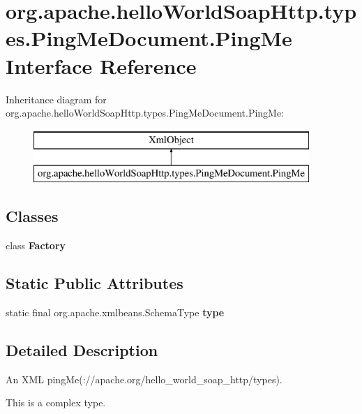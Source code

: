 \hypertarget{interfaceorg_1_1apache_1_1hello_world_soap_http_1_1types_1_1_ping_me_document_1_1_ping_me}{}\section{org.\+apache.\+hello\+World\+Soap\+Http.\+types.\+Ping\+Me\+Document.\+Ping\+Me Interface Reference}
\label{interfaceorg_1_1apache_1_1hello_world_soap_http_1_1types_1_1_ping_me_document_1_1_ping_me}
Inheritance diagram for org.\+apache.\+hello\+World\+Soap\+Http.\+types.\+Ping\+Me\+Document.\+Ping\+Me\+:\begin{figure}[H]
\begin{center}
\leavevmode
\includegraphics[height=2.000000cm]{interfaceorg_1_1apache_1_1hello_world_soap_http_1_1types_1_1_ping_me_document_1_1_ping_me}
\end{center}
\end{figure}
\subsection*{Classes}
\begin{DoxyCompactItemize}
\item 
class {\bfseries Factory}
\end{DoxyCompactItemize}
\subsection*{Static Public Attributes}
\begin{DoxyCompactItemize}
\item 
static final org.\+apache.\+xmlbeans.\+Schema\+Type {\bfseries type}
\end{DoxyCompactItemize}


\subsection{Detailed Description}
An X\+M\+L ping\+Me(\+://apache.org/hello\+\_\+world\+\_\+soap\+\_\+http/types).

This is a complex type. 

